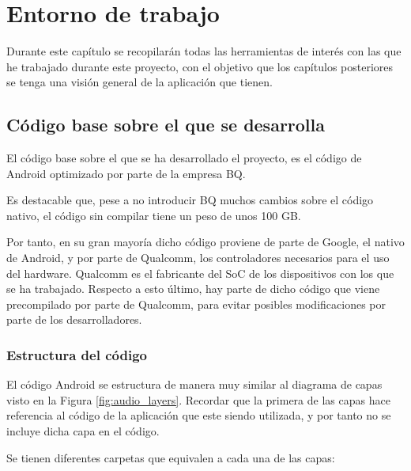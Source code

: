 \chapter{Entorno de trabajo}
Durante este capítulo se recopilarán todas las herramientas de interés con las que he trabajado durante este proyecto, con el objetivo que los capítulos posteriores se tenga una visión general de la aplicación que tienen.

\section{Código base sobre el que se desarrolla}
El código base sobre el que se ha desarrollado el proyecto, es el código de Android optimizado por parte de la empresa BQ.

Es destacable que, pese a no introducir BQ muchos cambios sobre el código nativo, el código sin compilar tiene un peso de unos 100 \gls{GB}.

Por tanto, en su gran mayoría dicho código proviene de parte de Google, el nativo de Android, y por parte de Qualcomm, los controladores necesarios para el uso del hardware. Qualcomm es el fabricante del \gls{SoC} de los dispositivos con los que se ha trabajado. Respecto a esto último, hay parte de dicho código que viene precompilado por parte de Qualcomm, para evitar posibles modificaciones por parte de los desarrolladores.


\subsection{Estructura del código}
El código Android se estructura de manera muy similar al diagrama de capas visto en la Figura \ref{fig:audio_layers}. Recordar que la primera de las capas hace referencia al código de la aplicación que este siendo utilizada, y por tanto no se incluye dicha capa en el código.

Se tienen diferentes carpetas que equivalen a cada una de las capas:

